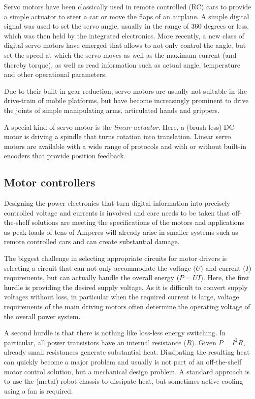 Servo motors have been classically used in remote controlled (RC) cars to provide a simple actuator to steer a car or move the flaps of an airplane. A simple digital signal was used to set the servo angle, usually in the range of 360 degrees or less, which was then held by the integrated electronics. More recently, a new class of digital servo motors have emerged that allows to not only control the angle, but set the speed at which the servo moves as well as the maximum current (and thereby torque), as well as read information such as actual angle, temperature and other operational parameters. 

Due to their built-in gear reduction, servo motors are usually not suitable in the drive-train of mobile platforms, but have become increasingly prominent to drive the joints of simple manipulating arms, articulated hands and grippers. 

A special kind of servo motor is the \emph{linear actuator}. Here, a (brush-less) DC motor is driving a spindle that turns rotation into translation. Linear servo motors are available with a wide range of protocols and with or without built-in encoders that provide position feedback.

\subsection{Motor controllers}
Designing the power electronics that turn digital information into precisely controlled voltage and currents is involved and care needs to be taken that off-the-shelf solutions are meeting the specifications of the motors and applications as peak-loads of tens of Amperes will already arise in smaller systems such as remote controlled cars and can create substantial damage.

The biggest challenge in selecting appropriate circuits for motor drivers is selecting a circuit that can not only accommodate the voltage ($U$) and current ($I$) requirements, but can actually handle the overall energy ($P=UI$). Here, the first hurdle is providing the desired supply voltage. As it is difficult to convert supply voltages without loss, in particular when the required current is large, voltage requirements of the main driving motors often determine the operating voltage of the overall power system. 

A second hurdle is that there is nothing like loss-less energy switching. In particular, all power transistors have an internal resistance ($R$). Given $P=I^2R$, already small resistances generate substantial heat. Dissipating the resulting heat can quickly become a major problem and usually is not part of an off-the-shelf motor control solution, but a mechanical design problem. A standard approach is to use the (metal) robot chassis to dissipate heat, but sometimes active cooling using a fan is required. 


